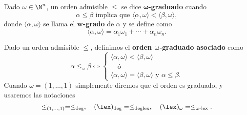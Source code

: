 
\begin{definicion}
    Dado $\omega\in \N^n$, un orden admisible $\le$ se dice \textbf{$\boldsymbol{\omega}$-graduado} cuando
    \begin{equation*}
        \alpha\le \beta \text { implica que } \langle \alpha, \omega\rangle  < \langle \beta, \omega\rangle,
    \end{equation*}
    donde $\langle \alpha, \omega\rangle$ se llama el \textbf{$\boldsymbol{w}$-grado} de $\alpha$ y se define como
    \begin{equation}
        \langle \alpha, \omega\rangle = \alpha_1 \omega_1 + \cdots + \alpha_n \omega_n.
    \end{equation}
\end{definicion}

\begin{definicion}
    Dado un orden admisible $\le$, definimos el \textbf{orden $\boldsymbol{\omega}$-graduado asociado} como
    \begin{equation*}
        \alpha \le_{\omega} \beta \iff \begin{cases}
            \langle \alpha, \omega\rangle  < \langle \beta, \omega\rangle \\
            \quad\text{ó}   \\
           \langle \alpha, \omega\rangle = \langle \beta, \omega\rangle \text{ y } \alpha \le \beta.
        \end{cases}
    \end{equation*}
    Cuando $\omega = (1,\dots, 1)$ simplemente diremos que el orden es graduado, y usaremos las notaciones
    \begin{equation*}
        \le_{(1,\dots,1)} = \le_{\text{deg}},\quad (\lex)_{\text{deg}} = \le_{\text{deglex}},\quad (\lex)_{\omega} = \le_{\omega\text{-lex}}.
    \end{equation*}
\end{definicion}

